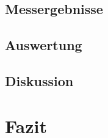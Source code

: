 \documentclass[12pt,a4paper]{article}
\begin{document}
\subsection{Messergebnisse}
\subsection{Auswertung}
\subsection{Diskussion}
\section{Fazit}
\end{document}
